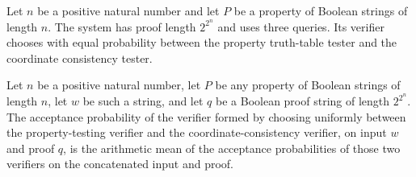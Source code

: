 \begin{definition}
\label{FABL.arbitraryPropertyPCPPSystem}
\leanok
{}
Let $n$ be a positive natural number and let $P$ be a property of Boolean strings of
length $n$. The system has proof length $2^{2^n}$ and uses three queries. Its verifier
chooses with equal probability between the property truth-table tester and the
coordinate consistency tester.
\end{definition}

\begin{theorem}
\label{FABL.arbitraryPropertyPCPPSystem_acceptanceProbability}
\leanok
{}
Let $n$ be a positive natural number, let $P$ be any property of Boolean strings of
length $n$, let $w$ be such a string, and let $q$ be a Boolean proof string of length
$2^{2^n}$. The acceptance probability of the verifier formed by choosing uniformly
between the property-testing verifier and the coordinate-consistency verifier, on input
$w$ and proof $q$, is the arithmetic mean of the acceptance probabilities of those two
verifiers on the concatenated input and proof.
\end{theorem}

